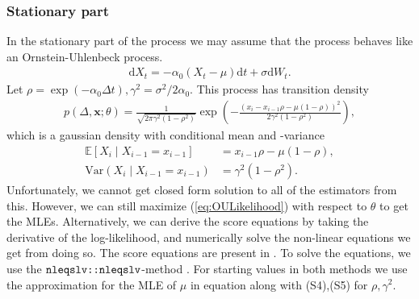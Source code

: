 \subsubsection{Stationary part}\label{subsubsec:OUprocessStationary}
In the stationary part of the process we may assume that the process behaves like an Ornstein-Uhlenbeck process. 
\begin{align}
    \mathrm{d}X_t = -\alpha_0\left(X_t-\mu\right) \mathrm{d}t + \sigma \mathrm{d}W_t.
\end{align}
Let $\rho = \exp\left(-\alpha_0\Delta t\right), \gamma^2 = \sigma^2/2\alpha_0$. This process has transition density \cite[equation (S3)]{DitlevsenSupplementary}
\begin{align}
    p\left(\Delta, \mathbf{x};\theta\right) = \frac{1}{\sqrt{2\pi\gamma^2\left(1-\rho^2\right)}}\exp\left(-\frac{\left(x_i-x_{i-1}\rho - \mu\left(1-\rho\right)\right)^2}{2\gamma^2\left(1-\rho^2\right)}\right), \label{eq:OULikelihood}
\end{align}
which is a gaussian density with conditional mean and -variance
\begin{align}
    \mathbb{E}\left[X_i\middle|X_{i-1} = x_{i-1}\right] &= x_{i - 1}\rho - \mu\left(1-\rho\right),\\
    \mathrm{Var}\left(X_i\middle|X_{i-1} = x_{i-1}\right) &= \gamma^2\left(1-\rho^2\right).
\end{align}
Unfortunately, we cannot get closed form solution to all of the estimators from this. However, we can still maximize (\ref{eq:OULikelihood}) with respect to $\theta$ to get the MLEs. Alternatively, we can derive the score equations by taking the derivative of the log-likelihood, and numerically solve the non-linear equations we get from doing so. The score equations are present in \cite[p.1, bottom]{DitlevsenSupplementary}. To solve the equations, we use the $\texttt{nleqslv::nleqslv}$-method \cite{nleqslv}. For starting values in both methods we use the approximation for the MLE of $\mu$ in equation \cite[(S4)]{DitlevsenSupplementary} along with (S4),(S5) for $\rho, \gamma^2$. 
